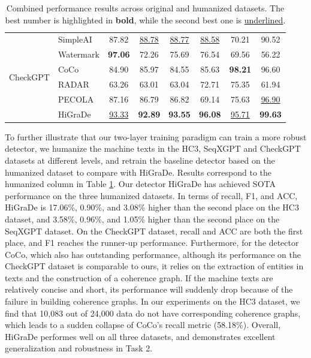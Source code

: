 \documentclass[11pt]{article}
\begin{document}
\begin{table}[ht]
{\begin{tabular}{llccc|ccc}
        \multirow{6}{*}{CheckGPT}
        & SimpleAI & 87.82 & \underline{88.78} & \underline{88.77} & \underline{88.58} & 70.21 & 90.52 \\
        & Watermark & \textbf{97.06} & 72.26 & 75.69 & 76.54 & 69.56 & 56.22 \\
        & CoCo & 84.90 & 85.97 & 84.55 & 85.63 & \textbf{98.21} & 96.60 \\
        & RADAR & 63.26 & 63.01 & 63.04 & 72.71 & 75.35 & 61.94 \\
        & PECOLA & 87.16 & 86.79 & 86.82 & 69.14 & 75.63 & \underline{96.90} \\
        & HiGraDe & \underline{93.33} & \textbf{92.89} & \textbf{93.55} & \textbf{96.08} & \underline{95.71} & \textbf{99.63} \\
        \bottomrule
    \end{tabular}
			}
			\caption{Combined performance results across original and humanized datasets. The best number is highlighted in \textbf{bold}, while the second best one is \underline{underlined}.}
			\label{tab:combined_results}
	\end{table}

			To further illustrate that our two-layer training paradigm can train a more robust detector, we humanize the machine texts in the HC3, SeqXGPT and CheckGPT datasets at different levels, and retrain the baseline detector based on the humanized dataset to compare with HiGraDe. Results correspond to the humanized column in Table \ref{tab:combined_results}. Our detector HiGraDe has achieved SOTA performance on the three humanized datasets. In terms of recall, F1, and ACC, HiGraDe is 17.06\%, 0.90\%, and 3.08\% higher than the second place on the HC3 dataset, and 3.58\%, 0.96\%, and 1.05\% higher than the second place on the SeqXGPT dataset. On the CheckGPT dataset, recall and ACC are both the first place, and F1 reaches the runner-up performance. Furthermore, for the detector CoCo, which also has outstanding performance, although its performance on the CheckGPT dataset is comparable to ours, it relies on the extraction of entities in texts and the construction of a coherence graph. If the machine texts are relatively concise and short, its performance will suddenly drop because of the failure in building coherence graphs. In our experiments on the HC3 dataset, we find that 10,083 out of 24,000 data do not have corresponding coherence graphs, which leads to a sudden collapse of CoCo's recall metric (58.18\%). Overall, HiGraDe performes well on all three datasets, and demonstrates excellent generalization and robustness in Task 2.
\end{document}
